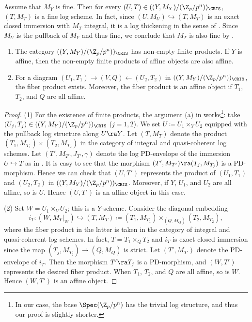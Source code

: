 \begin{rem}\label{rem:fine log structure in absolute log crystalline site}
Assume that $M_Y$ is fine. Then for every $(U,T)\in ((Y,M_Y)/(\Z_p/p^n))_\CRIS$, $(T,M_T)$ is a fine log scheme. In fact, since $(U,M_U)\hookrightarrow (T,M_T)$ is an exact closed immersion with $M_T$ integral, it is a log thickening in the sense of \cite[Def.~IV.2.1.1]{Ogus-log}. Since $M_U$ is the pullback of $M_Y$ and thus fine, we conclude that $M_T$ is also fine by \cite[Prop.~IV.2.1.3.1]{Ogus-log}.
\end{rem}



\begin{lem}\label{lem:nonempty finite limit in abs log cristalline site}
\hfill
\begin{enumerate}
    \item The category $((Y,M_Y)/(\Z_p/p^n))_\CRIS$ has non-empty finite products. If $Y$ is affine, then the non-empty finite products of affine objects are also affine.
    \item For a diagram $(U_1,T_1)\rightarrow (V,Q) \leftarrow (U_2,T_2)$ in $((Y,M_Y)/(\Z_p/p^n))_\CRIS$, the fiber product exists. 
    Moreover, the fiber product is an affine object if $T_1$, $T_2$, and $Q$ are all affine.
\end{enumerate}
\end{lem}

\begin{proof}
(1) 
For the existence of finite products, the argument (a) in \cite[1.5, Prop.]{Beilinson-crystalline-period-map} works\footnote{In our case, the base $\Spec (\Z_p/p^n)$ has the trivial log structure, and thus our proof is slightly shorter.}: take $(U_j,T_j)\in ((Y,M_Y)/(\Z_p/p^n))_\CRIS$ ($j=1,2$).
We set $U\coloneqq U_1\times_YU_2$ equipped with the pullback log structure along $U\ra Y$. Let $(T,M_T)$ denote the product $(T_1,M_{T_1})\times (T_2,M_{T_2})$ in the category of integral and quasi-coherent log schemes. Let $(T',M_{T'},J_{T'},\gamma)$ denote the log PD-envelope of the immersion $U\hookrightarrow T$ as in \cite[1.3, Thm.]{Beilinson-crystalline-period-map}. It is easy to see that the morphism $(T',M_{T'})\ra (T_j, M_{T_j})$ is a PD-morphism. Hence we can check that $(U,T')$ represents the product of $(U_1,T_1)$ and $(U_2,T_2)$ in $((Y,M_Y)/(\Z_p/p^n))_\CRIS$.
Moreover, if $Y$, $U_1$, and $U_2$ are all affine, so is $U$. Hence $(U,T')$ is an affine object in this case.

(2)
Set $W=U_1\times_VU_2$; this is a $Y$-scheme.
Consider the diagonal embedding
\[
i_T\colon (W,M_Y|_W)\hookrightarrow (T,M_T)\coloneqq (T_1,M_{T_1})\times_{(Q,M_Q)}(T_2,M_{T_2}),
\]
where the fiber product in the latter is taken in the category of integral and quasi-coherent log schemes. 
In fact, $T=T_1\times_Q T_2$ and $i_T$ is exact closed immersion since the map $(T_j,M_{T_j})\rightarrow (Q,M_Q)$ is strict.
Let $(T',M_{T'})$ denote the PD-envelope of $i_T$. Then the morphism $T'\ra T_j$ is a PD-morphism, and $(W, T')$ represents the desired fiber product.
When $T_1$, $T_2$, and $Q$ are all affine, so is $W$. Hence $(W,T')$ is an affine object.
\end{proof}



